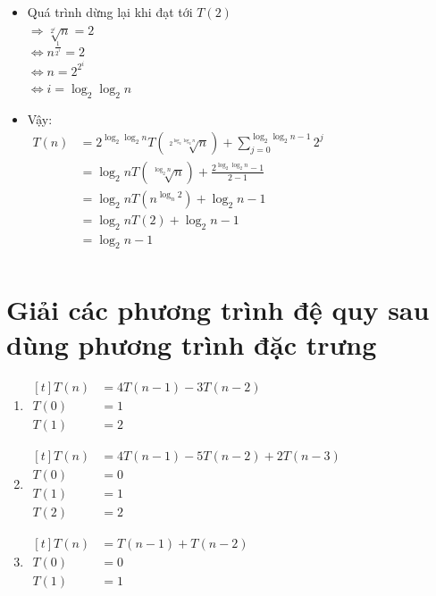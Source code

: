 \documentclass[12pt, letterpaper]{article}
\begin{document}
\begin{itemize}[label=-]
    \item Quá trình dừng lại khi đạt tới $ T(2) $ \\
        $ \Rightarrow \sqrt[2^i]{n} = 2 $ \\
        $ \Leftrightarrow n^\frac{1}{2^i} = 2 $ \\
        $ \Leftrightarrow n = 2^{2^i} $ \\
        $ \Leftrightarrow i = \log_2\log_2n $
    \item Vậy:\\
        $ \begin{aligned}
            T(n) &= 2^{\log_2\log_2n} T(\sqrt[2^{\log_2\log_2n}]{n}) + \sum_{j = 0}^{\log_2\log_2n - 1}2^j \\
            &= \log_2n T(\sqrt[\log_2n]{n}) + \frac{2^{\log_2\log_2n} - 1}{2 - 1} \\
                &= \log_2n T(n^{\log_n2}) + \log_2n - 1 \\
                &= \log_2n T(2) + \log_2n - 1 \\
                &= \log_2n - 1 \\
        \end{aligned} $
\end{itemize}
\section{Giải các phương trình đệ quy sau dùng phương trình đặc trưng}
\begin{enumerate}
    \item $ \begin{aligned}[t]
            T(n) &= 4T(n - 1) - 3T(n-2) \\
            T(0) &= 1 \\
            T(1) &= 2
    \end{aligned} $

    \item $ \begin{aligned}[t]
            T(n) &= 4T(n - 1) - 5T(n - 2) + 2T(n - 3) \\
            T(0) &= 0 \\
            T(1) &= 1 \\
            T(2) &= 2
    \end{aligned} $

    \item $ \begin{aligned}[t]
            T(n) &= T(n - 1) + T(n - 2) \\
            T(0) &= 0 \\
            T(1) &= 1
    \end{aligned} $

\end{enumerate}
\end{document}
